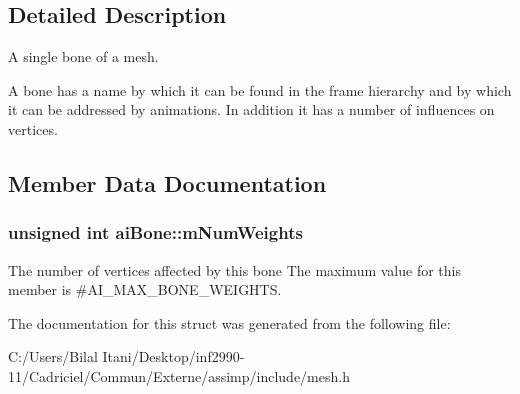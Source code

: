 \subsection{Detailed Description}
A single bone of a mesh. 

A bone has a name by which it can be found in the frame hierarchy and by which it can be addressed by animations. In addition it has a number of influences on vertices. 

\subsection{Member Data Documentation}
\subsubsection[{\texorpdfstring{m\+Num\+Weights}{mNumWeights}}]{\setlength{\rightskip}{0pt plus 5cm}unsigned int ai\+Bone\+::m\+Num\+Weights}\hypertarget{structai_bone_a87a79d42a0132753aac66397ad6f9b71}{}\label{structai_bone_a87a79d42a0132753aac66397ad6f9b71}
The number of vertices affected by this bone The maximum value for this member is \#\+A\+I\+\_\+\+M\+A\+X\+\_\+\+B\+O\+N\+E\+\_\+\+W\+E\+I\+G\+H\+TS. 

The documentation for this struct was generated from the following file\+:\begin{DoxyCompactItemize}
\item 
C\+:/\+Users/\+Bilal Itani/\+Desktop/inf2990-\/11/\+Cadriciel/\+Commun/\+Externe/assimp/include/mesh.\+h\end{DoxyCompactItemize}
